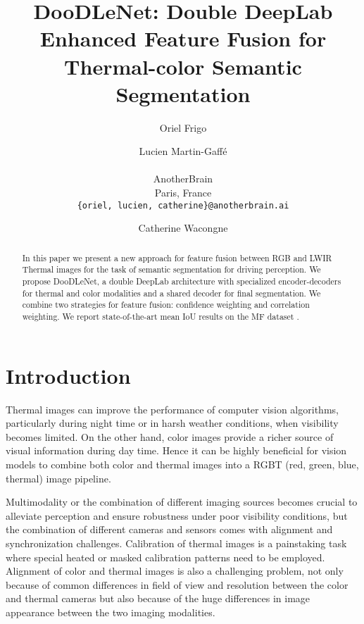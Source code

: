 \documentclass[10pt,twocolumn,letterpaper]{article}
\begin{document}
\title{DooDLeNet: Double DeepLab Enhanced Feature Fusion for Thermal-color Semantic Segmentation}

\author{Oriel Frigo\\
\and
Lucien Martin-Gaffé\\ \\
AnotherBrain\\
Paris, France\\
{\tt\small \{oriel, lucien, catherine\}@anotherbrain.ai}
\and
Catherine Wacongne\\
}


\maketitle

\begin{abstract}
In this paper we present a new approach for feature fusion between RGB and LWIR Thermal images for the task of semantic segmentation for driving perception. We propose DooDLeNet, a double DeepLab architecture with specialized encoder-decoders for thermal and color modalities and a shared decoder for final segmentation. We combine two strategies for feature fusion: confidence weighting and correlation weighting. We report state-of-the-art mean IoU results on the MF dataset \cite{Ha2017}.
\end{abstract}

\section{Introduction}
\label{sec:intro}

Thermal images can improve the performance of computer vision algorithms, particularly during night time or in harsh weather conditions, when visibility becomes limited.
On the other hand, color images provide a richer source of visual information during day time. Hence it can be highly beneficial for vision models to combine both color and thermal images into a RGBT (red, green, blue, thermal) image pipeline.

Multimodality or the combination of different imaging sources becomes crucial to alleviate perception and ensure robustness under poor visibility conditions, but the combination of different cameras and sensors comes with alignment and synchronization challenges. Calibration of thermal images is a painstaking task where special heated or masked calibration patterns need to be employed.
Alignment of color and thermal images is also a challenging problem, not only because of common differences in field of view and resolution  between the color and thermal cameras but also because of the huge differences in image appearance between the two imaging modalities. 
\end{document}
